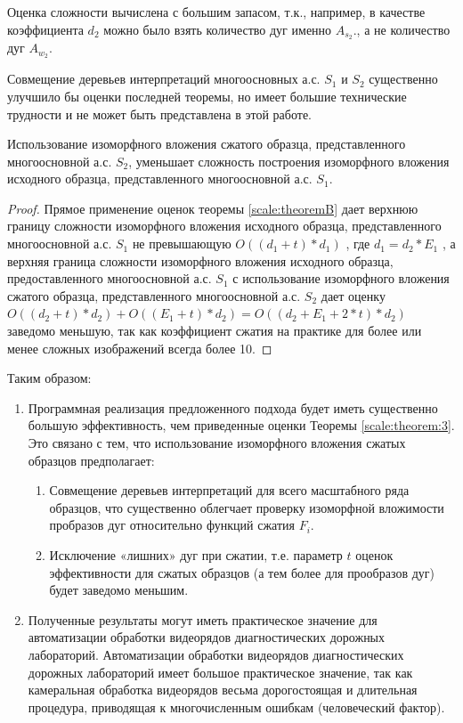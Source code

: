 \begin{remark}
Оценка сложности вычислена с большим запасом, т.к., например, в качестве коэффициента $d_2$  можно было взять количество  дуг именно  $A_{s_2}$., а не количество  дуг  $A_{w_2}$.
\end{remark}

\begin{remark}
Совмещение деревьев интерпретаций   многоосновных  а.с. $S_1$  и  $S_2$ существенно улучшило бы оценки последней теоремы, но имеет большие технические трудности и не может быть представлена  в этой работе.
\end{remark}

\begin{theorem} 
Использование изоморфного вложения сжатого образца, представленного  многоосновной  а.с. $S_2$,  уменьшает сложность построения изоморфного вложения исходного образца, представленного  многоосновной  а.с.  $S_1$.
\label{scale:theorem:3}
\end{theorem}

\begin{proof}
Прямое применение оценок теоремы \ref{scale:theoremB}  дает верхнюю границу сложности изоморфного вложения исходного образца, представленного  многоосновной  а.с. $S_1$  не превышающую $O((d_1 + t)* d_1)$ , где  $d_1 = d_2 * E_1$ , а верхняя граница  сложности изоморфного вложения исходного образца, предоставленного  многоосновной  а.с.   $S_1$  с использование изоморфного вложения сжатого образца, представленного  многоосновной  а.с.  $S_2$ дает оценку $O((d_2 + t)* d_2) +  O((E_1 + t)* d_2) =  O((d_2 + E_1 + 2 * t ) * d_2 )$ заведомо меньшую, так как коэффициент сжатия на практике для более или менее сложных изображений всегда более 10.
\end{proof}
                  
Таким образом:
\begin{enumerate}
\item  Программная реализация предложенного подхода будет иметь существенно большую эффективность, чем приведенные оценки  Теоремы \ref{scale:theorem:3}. Это связано с тем, что использование изоморфного вложения сжатых образцов предполагает:
\begin{enumerate}
\item Совмещение деревьев интерпретаций для всего масштабного ряда образцов, что существенно облегчает проверку изоморфной вложимости пробразов дуг относительно функций сжатия $F_i$. 
\item Исключение «лишних» дуг при сжатии, т.е. параметр $t$ оценок эффективности  для сжатых образцов (а тем более для прообразов дуг) будет заведомо меньшим.  
\end{enumerate}
\item Полученные результаты могут иметь практическое значение для автоматизации обработки видеорядов диагностических дорожных лабораторий.  Автоматизации обработки видеорядов диагностических дорожных лабораторий имеет большое практическое значение, так как камеральная обработка видеорядов весьма дорогостоящая и длительная процедура, приводящая к многочисленным ошибкам (человеческий фактор).  
\end{enumerate}


